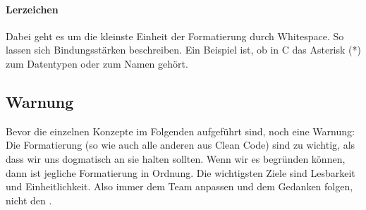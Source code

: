 		\paragraph{Lerzeichen}
			Dabei geht es um die kleinste Einheit der Formatierung durch Whitespace.
			So lassen sich Bindungsstärken beschreiben.
			Ein Beispiel ist, ob in C das Asterisk (*) zum Datentypen oder zum Namen gehört.

	\subsection{Warnung}
		Bevor die einzelnen Konzepte im Folgenden aufgeführt sind, noch eine Warnung:\\
		Die Formatierung (so wie auch alle anderen  aus Clean Code) sind zu wichtig, als dass wir uns dogmatisch an sie halten sollten.
		Wenn wir es begründen können, dann ist jegliche Formatierung in Ordnung.
		Die wichtigsten Ziele sind Lesbarkeit und Einheitlichkeit.
		Also immer dem Team anpassen und dem Gedanken folgen, nicht den .
